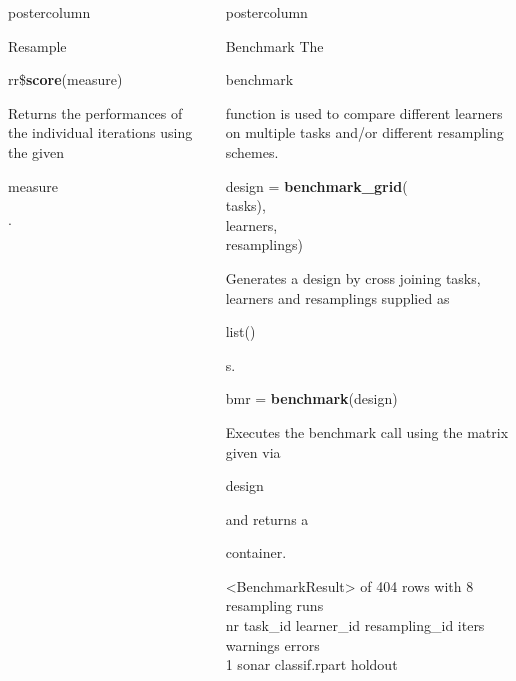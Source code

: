 \documentclass{beamer}
\newlength{\columnheight} %
\newcommand{\codeinline}[1]{\begin{codeboxinline}#1\end{codeboxinline}}
\begin{document}
\begin{withoutheader}
\begin{frame}[fragile]{}
\begin{columns}
\begin{column}{.245\textwidth}
\begin{beamercolorbox}[center]{postercolumn}
\begin{minipage}{.98\textwidth}
{\begin{myblock}{Resample}
							\\
							\begin{codebox}
								rr\$\textbf{score}(measure)
							\end{codebox}
							Returns the performances of the individual iterations using the given \codeinline{measure}.
						\end{myblock}
						\vfill
					}
				\end{minipage}
			\end{beamercolorbox}
		\end{column}
		\begin{column}{.245\textwidth}
			\begin{beamercolorbox}[center]{postercolumn}
				\begin{minipage}{.98\textwidth}
					\parbox[t][\columnheight]{\textwidth}{
						\begin{myblock}{Benchmark}
						The \codeinline{benchmark} function is used to compare different learners on multiple tasks and/or different resampling schemes.
						\\
						\begin{codeboxmultiline}[width=21.95cm]
							design = \textbf{benchmark\_grid}(\\
							\hspace*{1ex}tasks),\\
							\hspace*{1ex}learners,\\
							\hspace*{1ex}resamplings)
						\end{codeboxmultiline}
						Generates a design by cross joining tasks, learners and resamplings supplied as \codeinline{list()}s.
						\\
						\begin{codebox}
							bmr = \textbf{benchmark}(design)
						\end{codebox}
						Executes the benchmark call
						using the matrix given via \codeinline{design} and
						returns a \codeinline{}
						container.\\
						\begin{codeboxmultiline}[width=27cm]
							\scriptsize{
								<BenchmarkResult> of 404 rows with 8 resampling runs\\
								nr task\_id \space\space\space\space learner\_id resampling\_id iters warnings errors\\
								1 \space\space\space sonar \space classif.rpart
								\space\space\space\space\space\space holdout
}
\end{codeboxmultiline}
\end{myblock}}
\end{minipage}
\end{beamercolorbox}
\end{column}
\end{columns}
\end{frame}
\end{withoutheader}
\end{document}
